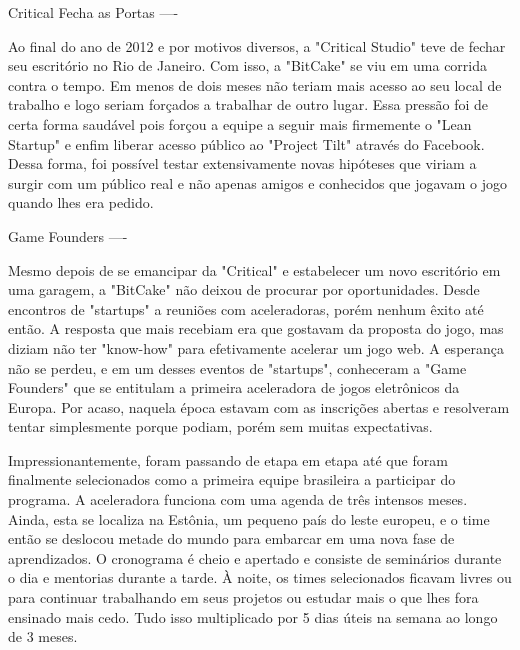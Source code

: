 Critical Fecha as Portas
----

Ao final do ano de 2012 e por motivos diversos, a "Critical Studio" teve de fechar seu escritório no Rio de Janeiro. Com isso, a "BitCake" se viu em uma corrida contra o tempo. Em menos de dois meses não teriam mais acesso ao seu local de trabalho e logo seriam forçados a trabalhar de outro lugar. Essa pressão foi de certa forma saudável pois forçou a equipe a seguir mais firmemente o "Lean Startup" e enfim liberar acesso público ao "Project Tilt" através do Facebook. Dessa forma, foi possível testar extensivamente novas hipóteses que viriam a surgir com um público real e não apenas amigos e conhecidos que jogavam o jogo quando lhes era pedido.


Game Founders
----

Mesmo depois de se emancipar da "Critical" e estabelecer um novo escritório em uma garagem, a "BitCake" não deixou de procurar por oportunidades. Desde encontros de "startups" a reuniões com aceleradoras, porém nenhum êxito até então. A resposta que mais recebiam era que gostavam da proposta do jogo, mas diziam não ter "know-how" para efetivamente acelerar um jogo web. A esperança não se perdeu, e em um desses eventos de "startups", conheceram a "Game Founders" que se entitulam a primeira aceleradora de jogos eletrônicos da Europa. Por acaso, naquela época estavam com as inscrições abertas e resolveram tentar simplesmente porque podiam, porém sem muitas expectativas.

Impressionantemente, foram passando de etapa em etapa até que foram finalmente selecionados como a primeira equipe brasileira a participar do programa. A aceleradora funciona com uma agenda de três intensos meses. Ainda, esta se localiza na Estônia, um pequeno país do leste europeu, e o time então se deslocou metade do mundo para embarcar em uma nova fase de aprendizados. O cronograma é cheio e apertado e consiste de seminários durante o dia e mentorias durante a tarde. À noite, os times selecionados ficavam livres ou para continuar trabalhando em seus projetos ou estudar mais o que lhes fora ensinado mais cedo. Tudo isso multiplicado por 5 dias úteis na semana ao longo de 3 meses.
